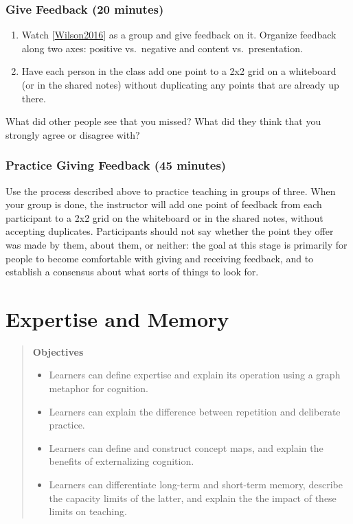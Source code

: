 \documentclass[10pt,statementpaper]{memoir}
\providecommand{\tightlist}{%
  \setlength{\itemsep}{0pt}\setlength{\parskip}{0pt}}
\begin{document}
\subsection*{Give Feedback (20 minutes)}\label{give-feedback-20-minutes}

\begin{enumerate}
\def\labelenumi{\arabic{enumi}.}
\item
  Watch {[}\href{biblio.html\#wilson-bad-teaching-live}{Wilson2016}{]}
  as a group and give feedback on it. Organize feedback along two axes:
  positive vs.~negative and content vs.~presentation.
\item
  Have each person in the class add one point to a 2x2 grid on a
  whiteboard (or in the shared notes) without duplicating any points
  that are already up there.
\end{enumerate}

What did other people see that you missed? What did they think that you
strongly agree or disagree with?

\subsection*{Practice Giving Feedback (45
minutes)}\label{practice-giving-feedback-45-minutes}

Use the process described above to practice teaching in groups of three.
When your group is done, the instructor will add one point of feedback
from each participant to a 2x2 grid on the whiteboard or in the shared
notes, without accepting duplicates. Participants should not say whether
the point they offer was made by them, about them, or neither: the goal
at this stage is primarily for people to become comfortable with giving
and receiving feedback, and to establish a consensus about what sorts of
things to look for.

\chapter{Expertise and Memory}\label{expertise-and-memory}

\begin{quote}
\textbf{Objectives}

\begin{itemize}
\tightlist
\item
  Learners can define expertise and explain its operation using a graph
  metaphor for cognition.
\item
  Learners can explain the difference between repetition and deliberate
  practice.
\item
  Learners can define and construct concept maps, and explain the
  benefits of externalizing cognition.
\item
  Learners can differentiate long-term and short-term memory, describe
  the capacity limits of the latter, and explain the the impact of these
  limits on teaching.
\end{itemize}
\end{quote}
\end{document}
